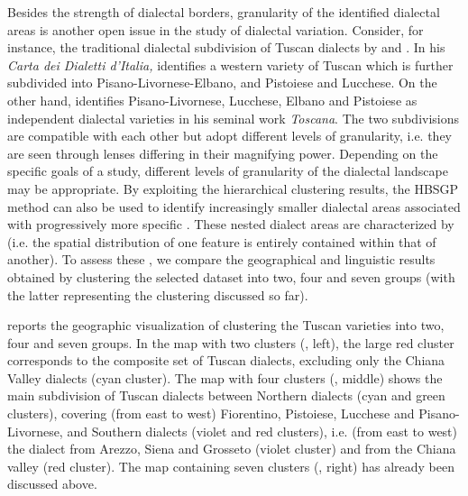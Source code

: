 \documentclass[output=paper]{LSP/langsci}
\begin{document}
Besides the strength of dialectal borders, granularity of the identified dialectal areas is another open issue in the study of dialectal variation. Consider, for instance, the traditional dialectal subdivision of Tuscan dialects by \citet{pellegrini_carta_1977} and \citet{giannelli_toscana_1976}. In his \textit{Carta dei Dialetti d’Italia, }\citet{pellegrini_carta_1977} identifies a western variety of Tuscan which is further subdivided into Pisano-Livornese-Elbano, and Pistoiese and Lucchese. On the other hand, \citet{giannelli_toscana_1976} identifies Pisano-Livornese, Lucchese, Elbano and Pistoiese as independent dialectal varieties in his seminal work \textit{Toscana}. The two subdivisions are compatible with each other but adopt different levels of granularity, i.e. they are seen through lenses differing in their magnifying power. Depending on the specific goals of a study, different levels of granularity of the dialectal landscape may be appropriate. By exploiting the hierarchical clustering results, the HBSGP method can also be used to identify increasingly smaller dialectal areas associated with progressively more specific . These nested dialect areas are characterized by  (i.e. the spatial distribution of one feature is entirely contained within that of another). To assess these , we compare the geographical and linguistic results obtained by clustering the selected dataset into two, four and seven groups (with the latter representing the clustering discussed so far).
 

 reports the geographic visualization of clustering the Tuscan varieties into two, four and seven groups. In the map with two clusters (, left), the large red cluster corresponds to the composite set of Tuscan dialects, excluding only the Chiana Valley dialects (cyan cluster). The map with four clusters (, middle) shows the main subdivision of Tuscan dialects between Northern dialects (cyan and green clusters), covering (from east to west) Fiorentino, Pistoiese, Lucchese and Pisano-Livornese, and Southern dialects (violet and red clusters), i.e. (from east to west) the dialect from Arezzo, Siena and Grosseto (violet cluster) and from the Chiana valley (red cluster). The map containing seven clusters (, right) has already been discussed above. 
\end{document}
